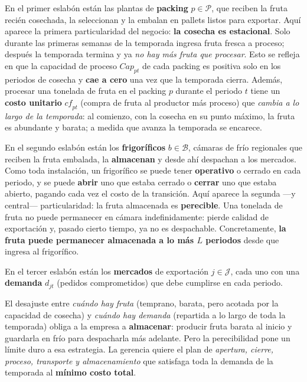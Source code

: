 \documentclass[12pt,a4paper]{article}
\begin{document}
En el primer eslabón están las plantas de \textbf{packing} $p\in\mathcal{P}$, que
reciben la fruta recién cosechada, la seleccionan y la embalan en pallets listos
para exportar. Aquí aparece la primera particularidad del negocio: \textbf{la
cosecha es estacional}. Solo durante las primeras semanas de la temporada
ingresa fruta fresca a proceso; después la temporada termina y ya \emph{no hay
más fruta que procesar}. Esto se refleja en que la capacidad de proceso
$\mathit{Cap}_{pt}$ de cada packing es positiva solo en los periodos de cosecha y
\textbf{cae a cero} una vez que la temporada cierra. Además, procesar una tonelada
de fruta en el packing $p$ durante el periodo $t$ tiene un \textbf{costo unitario}
$\mathit{cf}_{pt}$ (compra de fruta al productor más proceso) que \emph{cambia a lo
largo de la temporada}: al comienzo, con la cosecha en su punto máximo, la fruta
es abundante y barata; a medida que avanza la temporada se encarece.

En el segundo eslabón están los \textbf{frigoríficos} $b\in\mathcal{B}$, cámaras
de frío regionales que reciben la fruta embalada, la \textbf{almacenan} y desde
ahí despachan a los mercados. Como toda instalación, un frigorífico se puede
tener \textbf{operativo} o cerrado en cada periodo, y se puede \textbf{abrir} uno
que estaba cerrado o \textbf{cerrar} uno que estaba abierto, pagando cada vez el
costo de la transición. Aquí aparece la segunda —y central— particularidad: la
fruta almacenada es \textbf{perecible}. Una tonelada de fruta no puede permanecer
en cámara indefinidamente: pierde calidad de exportación y, pasado cierto tiempo,
ya no es despachable. Concretamente, \textbf{la fruta puede permanecer almacenada
a lo más $L$ periodos} desde que ingresa al frigorífico.

En el tercer eslabón están los \textbf{mercados} de exportación $j\in\mathcal{J}$,
cada uno con una \textbf{demanda} $d_{jt}$ (pedidos comprometidos) que debe
cumplirse en cada periodo.

El desajuste entre \emph{cuándo hay fruta} (temprano, barata, pero acotada por la
capacidad de cosecha) y \emph{cuándo hay demanda} (repartida a lo largo de toda la
temporada) obliga a la empresa a \textbf{almacenar}: producir fruta barata al
inicio y guardarla en frío para despacharla más adelante. Pero la perecibilidad
pone un límite duro a esa estrategia. La gerencia quiere el plan de
\emph{apertura, cierre, proceso, transporte y almacenamiento} que satisfaga toda
la demanda de la temporada al \textbf{mínimo costo total}.
\end{document}
